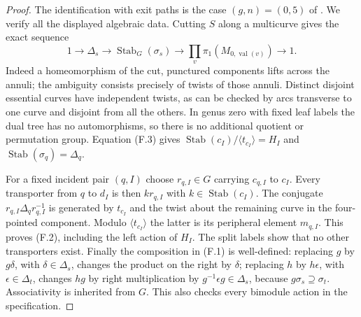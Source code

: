 \begin{proof}
The identification with exit paths is the case $(g,n)=(0,5)$ of
\citet[Construction 3.18 and Corollary 6.6]{FJansen2023}.  We verify all
the displayed algebraic data.  Cutting $S$ along a multicurve gives the
exact sequence
\[
 1\longrightarrow\Delta_s\longrightarrow
 \operatorname{Stab}_G(\sigma_s)\longrightarrow
 \prod_v\pi_1(M_{0,\operatorname{val}(v)})\longrightarrow1.       \tag{F.3}
\]
Indeed a homeomorphism of the cut, punctured components lifts across the
annuli; the ambiguity consists precisely of twists of those annuli.
Distinct disjoint essential curves have independent twists, as can be
checked by arcs transverse to one curve and disjoint from all the others.
In genus zero with fixed leaf labels the dual tree has no automorphisms,
so there is no additional quotient or permutation group.  Equation
(F.3) gives $\operatorname{Stab}(c_I)/\langle t_{c_I}\rangle=H_I$ and
$\operatorname{Stab}(\sigma_q)=\Delta_q$.

For a fixed incident pair $(q,I)$ choose
$r_{q,I}\in G$ carrying $c_{q,I}$ to $c_I$.  Every transporter from $q$
to $d_I$ is then $k r_{q,I}$ with
$k\in\operatorname{Stab}(c_I)$.  The conjugate
$r_{q,I}\Delta_qr_{q,I}^{-1}$ is generated by $t_{c_I}$ and the twist
about the remaining curve in the four-pointed component.  Modulo
$\langle t_{c_I}\rangle$ the latter is its peripheral element
$m_{q,I}$.  This proves (F.2), including the left action of $H_I$.
The split labels show that no other transporters exist.  Finally the
composition in (F.1) is well-defined: replacing $g$ by $g\delta$, with
$\delta\in\Delta_s$, changes the product on the right by
$\delta$; replacing $h$ by $h\epsilon$, with
$\epsilon\in\Delta_t$, changes $hg$ by right multiplication by
$g^{-1}\epsilon g\in\Delta_s$, because
$g\sigma_s\supseteq\sigma_t$.  Associativity is inherited from $G$.
This also checks every bimodule action in the specification.
\end{proof}

